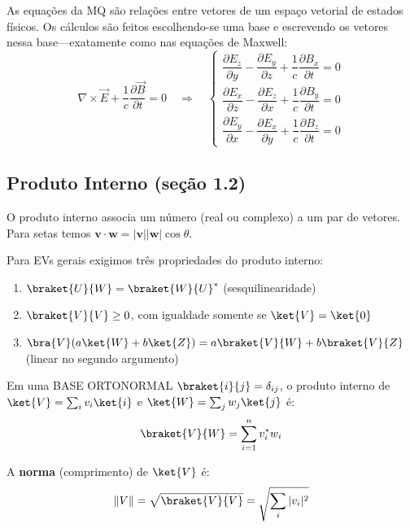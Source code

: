 As equações da MQ são relações entre vetores de um espaço vetorial de estados físicos. Os cálculos são feitos escolhendo-se uma base e escrevendo os vetores nessa base---exatamente como nas equações de Maxwell:
\[
    \nabla\times\vec{E} + \frac{1}{c}\frac{\partial\vec{B}}{\partial t} = 0
    \quad \Longrightarrow \quad
    \left\{\begin{array}{l}
        \dfrac{\partial E_z}{\partial y} - \dfrac{\partial E_y}{\partial z} + \dfrac{1}{c}\dfrac{\partial B_x}{\partial t} = 0 \\[4pt]
        \dfrac{\partial E_x}{\partial z} - \dfrac{\partial E_z}{\partial x} + \dfrac{1}{c}\dfrac{\partial B_y}{\partial t} = 0 \\[4pt]
        \dfrac{\partial E_y}{\partial x} - \dfrac{\partial E_x}{\partial y} + \dfrac{1}{c}\dfrac{\partial B_z}{\partial t} = 0
    \end{array}\right.
\]

\subsection*{Produto Interno (seção 1.2)}

O produto interno associa um número (real ou complexo) a um par de vetores. Para setas temos ${\bm v}\cdot{\bm w} = |{\bm v}||{\bm w}|\cos\theta$.

Para EVs gerais exigimos três propriedades do produto interno:
\begin{enumerate}
    \item $\braket{U}{W} = \braket{W}{U}^*$ \quad (sesquilinearidade)
    \item $\braket{V}{V} \geq 0$, com igualdade somente se $\ket{V} = \ket{0}$
    \item $\bra{V}\!\left(a\ket{W} + b\ket{Z}\right) = a\braket{V}{W} + b\braket{V}{Z}$ \quad (linear no segundo argumento)
\end{enumerate}

Em uma BASE ORTONORMAL $\braket{i}{j} = \delta_{ij}$, o produto interno de $\ket{V} = \sum_i v_i\ket{i}$ e $\ket{W} = \sum_j w_j\ket{j}$ é:
\begin{equation}
    \braket{V}{W} = \sum_{i=1}^n v_i^* w_i
\end{equation}

A \textbf{norma} (comprimento) de $\ket{V}$ é:
\begin{equation}
    \|V\| = \sqrt{\braket{V}{V}} = \sqrt{\sum_i |v_i|^2}
\end{equation}

